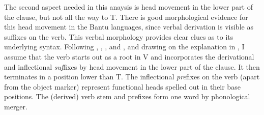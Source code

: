 \documentclass[output=paper
,modfonts
,nonflat]{langsci/langscibook}
\begin{document}
\begin{exe}
	\ex {}
	\xlist
	\endxlist
\end{exe} \vspace{-0.7cm}
The second aspect needed in this anaysis is head movement in the lower part of the clause, but not all the way to T. There is good morphological evidence for this head movement in the Bantu languages, since verbal derivation is visible as suffixes on the verb. This verbal morphology provides clear clues as to its underlying syntax. Following \citet{Myers1990}, \citet{Julien2002}, \citet{Kinyalolo2003}, and \citet{Buell2005}, and drawing on the explanation in \citet{Van_der_Wal2009}, I assume that the verb starts out as a root in V and incorporates the derivational and inflectional \textit{suf}fixes by head movement in the lower part of the clause. It then terminates in a position lower than T. The inflectional \textit{pre}fixes on the verb (apart from the object marker) represent functional heads spelled out in their base positions. The (derived) verb stem and prefixes form one word by phonological merger.
\end{document}
